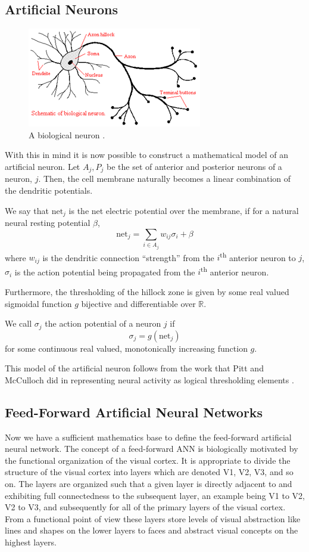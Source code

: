 \subsection{Artificial Neurons}
\begin{figure}
\centering
\includegraphics{neuron}
\caption{A biological neuron \cite{neuralimage}.}
\end{figure}
	With this in mind it is now possible to construct a mathematical model of an artificial neuron. Let \( A_j, P_j\) be the set of anterior and posterior neurons of a neuron, \(j\). Then, the cell membrane naturally becomes a linear combination of the dendritic potentials.
   \begin{definition}
   We say that \(\mathrm{net}_j\) is the net electric potential over the membrane, if for a natural neural resting potential \(\beta\), 
\[ \textrm{net}_j = \sum_{i \in A_j}{w_{ij}\sigma_i} + \beta \]where \(w_{ij}\) is the dendritic connection “strength” from the \(i\)\textsuperscript{th} anterior neuron to \(j\), \(\sigma_i\) is the action potential being propagated from the \(i\)\textsuperscript{th} anterior neuron. 
   \end{definition}
Furthermore, the thresholding of the hillock zone is given by some real valued sigmoidal function \(g\) bijective and differentiable over \(\mathbb{R}\). 
\begin{definition}
We call \(\sigma_j\) the action potential  of a neuron \(j\) if  
\[\sigma_j = g\left(\mathrm{net}_j\right)\]
for some continuous real valued, monotonically increasing function \(g\).
\end{definition}
This model of the artificial neuron follows from the work that Pitt and McCulloch did in representing neural activity as logical thresholding elements  \cite{mcculloch}.

\subsection{Feed-Forward Artificial Neural Networks}
	Now we have a sufficient mathematics base to define the feed-forward artificial neural network. The concept of a feed-forward ANN is biologically motivated by the functional organization of the visual cortex. It is appropriate to divide the structure of the visual cortex into layers which are denoted V1, V2, V3, and so on. The layers are organized such that a given layer is directly adjacent to and exhibiting full connectedness to the subsequent layer, an example being V1 to V2, V2 to V3, and subsequently for all of the primary layers of the visual cortex. From a functional point of view these layers store levels of visual abstraction like lines and shapes on the lower layers to faces and abstract visual concepts on the highest layers\cite{visualcortex}.

